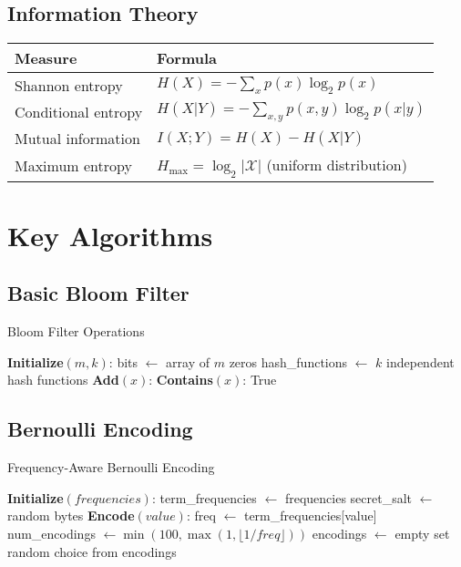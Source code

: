 \subsection{Information Theory}

\begin{center}
\begin{tabular}{|l|l|}
\hline
\textbf{Measure} & \textbf{Formula} \\
\hline
Shannon entropy & $H(X) = -\sum_x p(x) \log_2 p(x)$ \\
Conditional entropy & $H(X|Y) = -\sum_{x,y} p(x,y) \log_2 p(x|y)$ \\
Mutual information & $I(X;Y) = H(X) - H(X|Y)$ \\
Maximum entropy & $H_{\max} = \log_2 |\mathcal{X}|$ (uniform distribution) \\
\hline
\end{tabular}
\end{center}

\section{Key Algorithms}

\subsection{Basic Bloom Filter}

\begin{algorithm}[H]
\caption{Bloom Filter Operations}
\SetAlgoLined
\textbf{Initialize}$(m, k)$:\;
\Indp
    bits $\gets$ array of $m$ zeros\;
    hash\_functions $\gets$ $k$ independent hash functions\;
\Indm
\textbf{Add}$(x)$:\;
\Indp
\Indm
\textbf{Contains}$(x)$:\;
\Indp
    \Return True\;
\Indm
\end{algorithm}

\subsection{Bernoulli Encoding}

\begin{algorithm}[H]
\caption{Frequency-Aware Bernoulli Encoding}
\SetAlgoLined
\textbf{Initialize}$(frequencies)$:\;
\Indp
    term\_frequencies $\gets$ frequencies\;
    secret\_salt $\gets$ random bytes\;
\Indm
\textbf{Encode}$(value)$:\;
\Indp
    freq $\gets$ term\_frequencies[value]\;
    num\_encodings $\gets \min(100, \max(1, \lfloor 1/freq \rfloor))$\;
    encodings $\gets$ empty set\;
    \Return random choice from encodings\;
\Indm
\end{algorithm}

